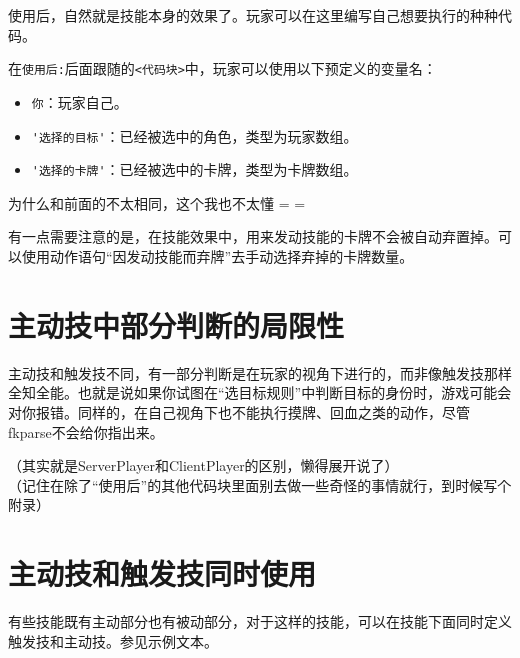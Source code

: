 使用后，自然就是技能本身的效果了。玩家可以在这里编写自己想要执行的种种代码。

在\verb|使用后:|后面跟随的\verb|<代码块>|中，玩家可以使用以下预定义的变量名：

\begin{itemize}
 \item \verb|你|：玩家自己。
 \item \verb|'选择的目标'|：已经被选中的角色，类型为玩家数组。
 \item \verb|'选择的卡牌'|：已经被选中的卡牌，类型为卡牌数组。
\end{itemize}

为什么和前面的不太相同，这个我也不太懂 = =

有一点需要注意的是，在技能效果中，用来发动技能的卡牌不会被自动弃置掉。可以使用动作语句“因发动技能而弃牌”去手动选择弃掉的卡牌数量。

\section{主动技中部分判断的局限性}

主动技和触发技不同，有一部分判断是在玩家的视角下进行的，而非像触发技那样全知全能。也就是说如果你试图在“选目标规则”中判断目标的身份时，游戏可能会对你报错。同样的，在自己视角下也不能执行摸牌、回血之类的动作，尽管fkparse不会给你指出来。

（其实就是ServerPlayer和ClientPlayer的区别，懒得展开说了） \\

（记住在除了“使用后”的其他代码块里面别去做一些奇怪的事情就行，到时候写个附录）

\section{主动技和触发技同时使用}

有些技能既有主动部分也有被动部分，对于这样的技能，可以在技能下面同时定义触发技和主动技。参见示例文本。
